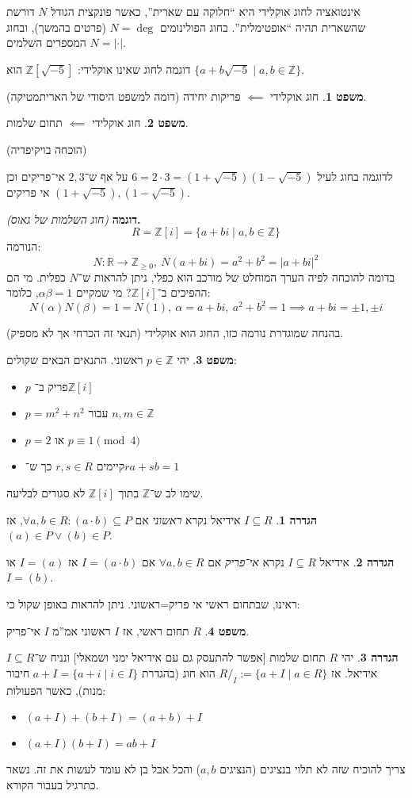 \documentclass[a4paper]{article}
\newcommand\Z     {\mathbb{Z}}
\newcommand\R     {\mathbb{R}}
\newcommand\co        {\colon}
\newcommand\ag        {\alpha}
\newcommand\bg        {\beta}
\newcommand\sof[1]    {\left | #1 \right |}
\theoremstyle{definition}
\newtheorem{Theorem}{משפט}
\newtheorem{definition}{הגדרה}
\newcommand\theo  [1] {\begin{Theorem}#1\end{Theorem}}
\newcommand\defi  [1] {\begin{definition}#1\end{definition}}
\begin{document}
	אינטואציה לחוג אוקלידי היא ``חלוקה עם שארית'', כאשר פונקצית הגודל $N$ דורשת שהשארית תהיה ``אופטימלית''. בחוג הפולינומים $N = \deg$ (פרטים בהמשך), ובחוג המספרים השלמים $N = \sof{\cdot}$. 
	
	דוגמה לחוג שאינו אוקלידי: $\Z[\sqrt{-5}]$ הוא $\{a + b\sqrt{-5} \mid a, b \in \Z\}$. 
	
	\theo{חוג אוקלידי $\impliedby$ פריקות יחידה (דומה למשפט היסודי של האריתמטיקה). }
	\theo{חוג אוקלידי $\impliedby$ תחום שלמות. }(הוכחה בויקיפדיה)
	
	לדוגמה בחוג לעיל $6 = 2 \cdot 3 = (1 + \sqrt{-5})(1 - \sqrt{-5})$ על אף ש־$2, 3$ אי־פריקים וכן $(1 + \sqrt{-5}), (1  - \sqrt{-5})$ אי פריקים. 
	
	
	\textbf{דוגמה }\textit{(חוג השלמות של גאוס)}\textbf{. }
	\[ R = \Z[i] = \{a + bi \mid a, b \in \Z\} \]
	הנורמה: 
	\[ N \co \R\to \Z_{\ge 0}, \ N(a + bi) = a^2 + b^2 = |a + bi|^2 \]
	בדומה להוכחה לפיה הערך המוחלט של מורכב הוא כפלי, ניתן להראות ש־$N$ כפלית. מי הם ההפיכים ב־$\Z[i]$? מי שמקיים $\ag \bg = 1$, כלומר: 
	\[ N(\ag)N(\bg) = 1 = N(1), \ \ag = a + bi, \ a^2 + b^2 = 1 \implies a + bi = \pm 1, \pm i \]
	
	בהנחה שמוגדרת נורמה כזו, החוג הוא אוקלידי (תנאי זה הכרחי אך לא מספיק). 
	
	\theo{יהי $p \in \Z$ ראשוני. התנאים הבאים שקולים: 
		\begin{itemize}
			\item $p$ פריק ב־$\Z[i]$
			\item $p = m^2 + n^2$ עבור $n, m \in \Z$
			\item $p = 2$ או $p \equiv 1 \pmod{4} $
			\item קיימים $r, s \in R$ כך ש־$ra + sb = 1$
	\end{itemize}}
	
	שימו לב ש־$\Z$ בתוך $\Z[i]$ לא סגורים לבליעה. 
	
	\defi{$I \subseteq R$ אידיאל נקרא \textit{ראשוני} אם $\forall a, b \in R \co (a \cdot b) \subseteq P$, אז $(a) \in P \lor (b) \in P$. }
	\defi{אידיאל $I \subseteq R$ נקרא \textit{אי־פריק} אם $\forall a, b \in R$ אם $I = (a \cdot b)$ אז $I = (a)$ או $I = (b)$. }
	ראינו, שבתחום ראשי אי פריק=ראשוני. ניתן להראות באופן שקול כי: 
	\theo{$R$ תחום ראשי, אז $I$ ראשוני אמ''מ $I$ אי־פריק. }
	\defi{יהי $R$ תחום שלמות [אפשר להתעסק גם עם אידיאל ימני ושמאלי] ונניח ש־$I \subseteq R$ אידיאל. אז $R/_I := \{a + I \mid a \in R\}$ הוא חוג (בהגדרת $a + I = \{a + i \mid i \in I\}$ חיבור מנות), כאשר הפעולות: 
		\begin{itemize}
			\item $(a + I) + (b + I) = (a + b) + I$
			\item $(a + I)(b + I) = ab + I$
	\end{itemize}}
	צריך להוכיח שזה לא תלוי בנציגים (הנציגים $a, b$) והכל אבל בן לא עומד לעשות את זה. נשאר כתרגיל בעבור הקורא. 
	
\end{document}
